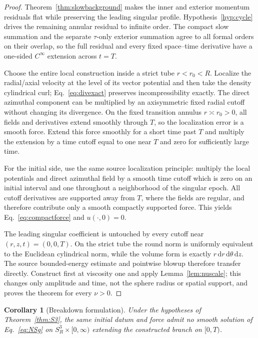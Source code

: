 \documentclass[aps,prd,reprint,superscriptaddress,nofootinbib,floatfix]{revtex4-2}
\newtheorem{corollary}[theorem]{Corollary}
\theoremstyle{definition}
\theoremstyle{remark}
\newcommand{\dd}{\mathrm{d}}
\begin{document}
\begin{proof}
	Theorem~\ref{thm:slowbackground} makes the inner and exterior momentum residuals flat while preserving the leading singular profile.  Hypothesis~\ref{hyp:cycle} drives the remaining annular residual to infinite order.  The compact slow summation and the separate $\tau$-only exterior summation agree to all formal orders on their overlap, so the full residual and every fixed space--time derivative have a one-sided $C^\infty$ extension across $t=T$.

	Choose the entire local construction inside a strict tube $r<r_0<R$.  Localize the radial/axial velocity at the level of its vector potential and then take the density cylindrical curl; Eq.~\eqref{eq:divexact} preserves incompressibility exactly.  The direct azimuthal component can be multiplied by an axisymmetric fixed radial cutoff without changing its divergence.  On the fixed transition annulus $r\asymp r_0>0$, all fields and derivatives extend smoothly through $T$, so the localization error is a smooth force.  Extend this force smoothly for a short time past $T$ and multiply the extension by a time cutoff equal to one near $T$ and zero for sufficiently large time.

	For the initial side, use the same source localization principle: multiply the local potentials and direct azimuthal field by a smooth time cutoff which is zero on an initial interval and one throughout a neighborhood of the singular epoch.  All cutoff derivatives are supported away from $T$, where the fields are regular, and therefore contribute only a smooth compactly supported force.  This yields Eq.~\eqref{eq:compactforce} and $u(\cdot,0)=0$.

	The leading singular coefficient is untouched by every cutoff near $(r,z,t)=(0,0,T)$.  On the strict tube the round norm is uniformly equivalent to the Euclidean cylindrical norm, while the volume form is exactly $r\,\dd r\,\dd\theta\,\dd z$.  The source bounded-energy estimate and pointwise blowup therefore transfer directly.  Construct first at viscosity one and apply Lemma~\ref{lem:nuscale}; this changes only amplitude and time, not the sphere radius or spatial support, and proves the theorem for every $\nu>0$.
\end{proof}

\begin{corollary}[Breakdown formulation]\label{cor:breakdown}
	Under the hypotheses of Theorem~\ref{thm:S3}, the same initial datum and force admit no smooth solution of Eq.~\eqref{eq:NSg} on $S^3_R\times[0,\infty)$ extending the constructed branch on $[0,T)$.
\end{corollary}
\end{document}
